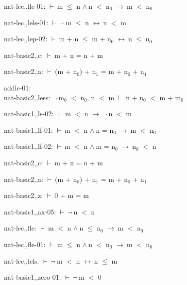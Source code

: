 \documentclass[a4paper]{article}
\newcommand{\Fol}{\mbox{$\vdash\ $}}
\newcommand{\Not}{\mbox{$\neg\ $}}
\newcommand{\And}{\mbox{$\wedge\ $}}
\newcommand{\Imp}{\mbox{$\rightarrow\ $}}
\newcommand{\Equiv}{\mbox{$\leftrightarrow\ $}}
\begin{document}
nat-lec,,fle-01: 
 \Fol m $\le$ n \And n $<$ $\mbox{n}_{0}$ \Imp m $<$ $\mbox{n}_{0}$



nat-lec,,lels-01: 
 \Fol \Not m $\le$ n \Equiv n $<$ m



nat-lec,,lep-02: 
 \Fol m + n $\le$ m + $\mbox{n}_{0}$ \Equiv n $\le$ $\mbox{n}_{0}$



nat-basic2,,c: 
 \Fol m + n = n + m



nat-basic2,,a: 
 \Fol (m + $\mbox{n}_{0}$) + $\mbox{n}_{1}$ = m + $\mbox{n}_{0}$ + $\mbox{n}_{1}$



\bigskip

addle-01:\\ nat-basic2,,less: 
\Not $\mbox{m}_{0}$ $<$ $\mbox{n}_{0}$, 
n $<$ m
 \Fol n + $\mbox{n}_{0}$ $<$ m + $\mbox{m}_{0}$

nat-basic1,,ls-02: 
 \Fol m $<$ n \Imp \Not n $<$ m



nat-basic1,,lf-01: 
 \Fol m $<$ n \And n = $\mbox{n}_{0}$ \Imp m $<$ $\mbox{n}_{0}$



nat-basic1,,lf-02: 
 \Fol m $<$ n \And m = $\mbox{n}_{0}$ \Imp $\mbox{n}_{0}$ $<$ n



nat-basic2,,c: 
 \Fol m + n = n + m



nat-basic2,,a: 
 \Fol (m + $\mbox{n}_{0}$) + $\mbox{n}_{1}$ = m + $\mbox{n}_{0}$ + $\mbox{n}_{1}$



nat-basic2,,z: 
 \Fol 0 + m = m



nat-basic1,,ax-05: 
 \Fol \Not n $<$ n



nat-lec,,fle: 
 \Fol m $<$ n \And n $\le$ $\mbox{n}_{0}$ \Imp m $<$ $\mbox{n}_{0}$



nat-lec,,fle-01: 
 \Fol m $\le$ n \And n $<$ $\mbox{n}_{0}$ \Imp m $<$ $\mbox{n}_{0}$



nat-lec,,lels: 
 \Fol \Not m $<$ n \Equiv n $\le$ m



nat-basic1,,zero-01: 
 \Fol \Not m $<$ 0
\end{document}
